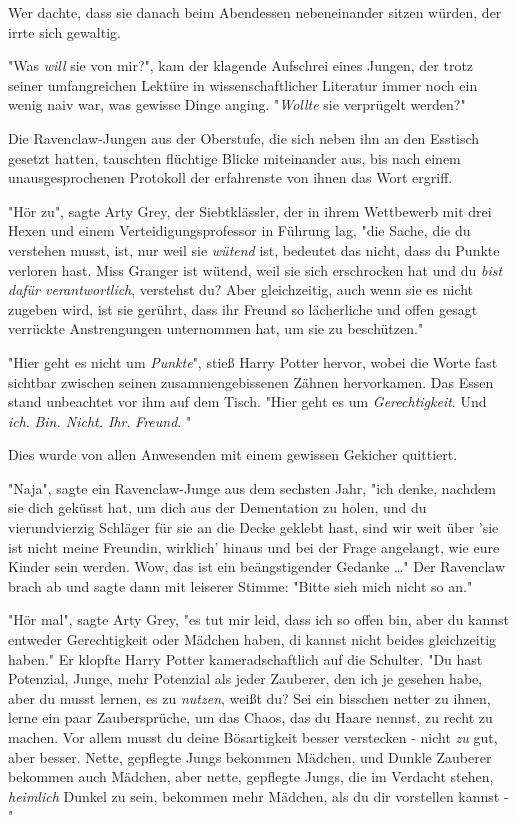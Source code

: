 {Wer dachte, dass sie danach beim Abendessen nebeneinander sitzen würden, der irrte sich gewaltig.

"Was \emph{will} sie von mir?", kam der klagende Aufschrei eines Jungen, der trotz seiner umfangreichen Lektüre in wissenschaftlicher Literatur immer noch ein wenig naiv war, was gewisse Dinge anging. "\emph{Wollte} sie verprügelt werden?"

Die Ravenclaw-Jungen aus der Oberstufe, die sich neben ihn an den Esstisch gesetzt hatten, tauschten flüchtige Blicke miteinander aus, bis nach einem unausgesprochenen Protokoll der erfahrenste von ihnen das Wort ergriff.

"Hör zu", sagte Arty Grey, der Siebtklässler, der in ihrem Wettbewerb mit drei Hexen und einem Verteidigungsprofessor in Führung lag, "die Sache, die du verstehen musst, ist, nur weil sie \emph{wütend} ist, bedeutet das nicht, dass du Punkte verloren hast. Miss Granger ist wütend, weil sie sich erschrocken hat und du \emph{bist dafür verantwortlich}, verstehst du? Aber gleichzeitig, auch wenn sie es nicht zugeben wird, ist sie gerührt, dass ihr Freund so lächerliche und offen gesagt verrückte Anstrengungen unternommen hat, um sie zu beschützen."

"Hier geht es nicht um \emph{Punkte}", stieß Harry Potter hervor, wobei die Worte fast sichtbar zwischen seinen zusammengebissenen Zähnen hervorkamen. Das Essen stand unbeachtet vor ihm auf dem Tisch. "Hier geht es um \emph{Gerechtigkeit}. Und \emph{ich}. \emph{Bin. Nicht. Ihr}. \emph{Freund}. "

Dies wurde von allen Anwesenden mit einem gewissen Gekicher quittiert.

"Naja", sagte ein Ravenclaw-Junge aus dem sechsten Jahr, "ich denke, nachdem sie dich geküsst hat, um dich aus der Dementation zu holen, und du vierundvierzig Schläger für sie an die Decke geklebt hast, sind wir weit über 'sie ist nicht meine Freundin, wirklich' hinaus und bei der Frage angelangt, wie eure Kinder sein werden. Wow, das ist ein beängstigender Gedanke …" Der Ravenclaw brach ab und sagte dann mit leiserer Stimme: "Bitte sieh mich nicht so an."

"Hör mal", sagte Arty Grey, "es tut mir leid, dass ich so offen bin, aber du kannst entweder Gerechtigkeit oder Mädchen haben, di kannst nicht beides gleichzeitig haben." Er klopfte Harry Potter kameradschaftlich auf die Schulter. "Du hast Potenzial, Junge, mehr Potenzial als jeder Zauberer, den ich je gesehen habe, aber du musst lernen, es zu \emph{nutzen}, weißt du? Sei ein bisschen netter zu ihnen, lerne ein paar Zaubersprüche, um das Chaos, das du Haare nennst, zu recht zu machen. Vor allem musst du deine Bösartigkeit besser verstecken - nicht \emph{zu} gut, aber besser. Nette, gepflegte Jungs bekommen Mädchen, und Dunkle Zauberer bekommen auch Mädchen, aber nette, gepflegte Jungs, die im Verdacht stehen, \emph{heimlich} Dunkel zu sein, bekommen mehr Mädchen, als du dir vorstellen kannst -"

}
